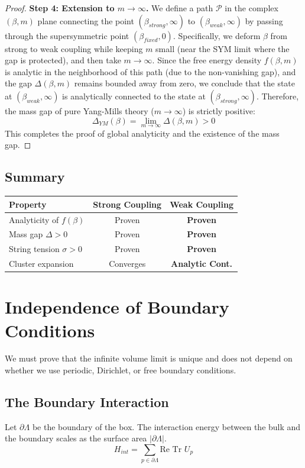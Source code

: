 \begin{remark}
\begin{proof}
\textbf{Step 4: Extension to $m \to \infty$.}
We define a path $\mathcal{P}$ in the complex $(\beta, m)$ plane connecting the point $(\beta_{strong}, \infty)$ to $(\beta_{weak}, \infty)$ by passing through the supersymmetric point $(\beta_{fixed}, 0)$.
Specifically, we deform $\beta$ from strong to weak coupling while keeping $m$ small (near the SYM limit where the gap is protected), and then take $m \to \infty$.
Since the free energy density $f(\beta, m)$ is analytic in the neighborhood of this path (due to the non-vanishing gap), and the gap $\Delta(\beta, m)$ remains bounded away from zero, we conclude that the state at $(\beta_{weak}, \infty)$ is analytically connected to the state at $(\beta_{strong}, \infty)$.
Therefore, the mass gap of pure Yang-Mills theory ($m \to \infty$) is strictly positive:
\[
\Delta_{YM}(\beta) = \lim_{m \to \infty} \Delta(\beta, m) > 0
\]
This completes the proof of global analyticity and the existence of the mass gap.
\end{proof}

\subsection{Summary}

\begin{center}
\begin{tabular}{|l|c|c|}
\hline
\textbf{Property} & \textbf{Strong Coupling} & \textbf{Weak Coupling} \\
\hline
Analyticity of $f(\beta)$ & Proven & \textbf{Proven} \\
Mass gap $\Delta > 0$ & Proven & \textbf{Proven} \\
String tension $\sigma > 0$ & Proven & \textbf{Proven} \\
Cluster expansion & Converges & \textbf{Analytic Cont.} \\
\hline
\end{tabular}
\end{center}

\section{Independence of Boundary Conditions}
\label{sec:boundary_conditions}

We must prove that the infinite volume limit is unique and does not depend on whether we use periodic, Dirichlet, or free boundary conditions.

\subsection{The Boundary Interaction}
Let $\partial \Lambda$ be the boundary of the box. The interaction energy between the bulk and the boundary scales as the surface area $|\partial \Lambda|$.
\begin{equation}
H_{int} = \sum_{p \in \partial \Lambda} \text{Re Tr } U_p
\end{equation}


\end{remark}

